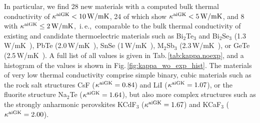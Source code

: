 In particular, we find 28 new materials with a computed bulk thermal conductivity of $\kappa^{\rm aiGK} < 10\,{\rm W/mK}$, 24 of which show $\kappa^{\rm aiGK} < 5\,{\rm W/mK}$, and 8 with $\kappa^{\rm aiGK} \leq 2\,{\rm W/mK}$,~i.\,e.,~comparable to the bulk thermal conductivity of existing and candidate thermoelectric materials such as Bi$_2$Te$_3$ and Bi$_2$Se$_3$ (1.3\,W/mK~\cite{Goldsmid.1956,Satterthwaite.1957}), PbTe (2.0\,W/mK~\cite{Elsharkawy.1983}), SnSe (1\,W/mK~\cite{Zhao.2014,Wei.2016,Sassi.2014}), M$_2$Sb$_3$ (2.3\,W/mK~\cite{Ahmadpour.2007,Pan.2020}), or GeTe (2.5\,W/mK~\cite{Perumal.2015}). A full list of all values is given in Tab.\,\ref{tab:kappa.noexp}, and a histogram of the values is shown in Fig.\,\ref{fig:kappa_wo_exp_hist}. The materials of very low thermal conductivity comprise simple binary, cubic materials such as the rock salt structures CsF ($\kappa^{\rm aiGK} = 0.84$) and LiI ($\kappa^{\rm aiGK} = 1.07$), or the fluorite structure Na$_2$Te ($\kappa^{\rm aiGK} = 1.64$), but also more complex structures such as the strongly anharmonic perovskites KCdF$_3$ ($\kappa^{\rm aiGK} = 1.67$) and KCaF$_3$ ($\kappa^{\rm aiGK} = 2.00$).


